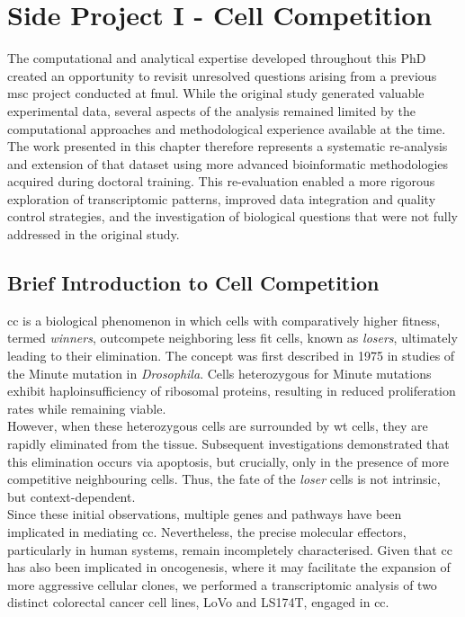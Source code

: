 \chapter{Side Project I - Cell Competition}

The computational and analytical expertise developed throughout this PhD created an opportunity to revisit unresolved questions arising from a previous \gls{msc} project conducted at \gls{fmul}. While the original study generated valuable experimental data, several aspects of the analysis remained limited by the computational approaches and methodological experience available at the time. The work presented in this chapter therefore represents a systematic re-analysis and extension of that dataset using more advanced bioinformatic methodologies acquired during doctoral training. This re-evaluation enabled a more rigorous exploration of transcriptomic patterns, improved data integration and quality control strategies, and the investigation of biological questions that were not fully addressed in the original study.

\section{Brief Introduction to Cell Competition}

\Gls{cc} is a biological phenomenon in which cells with comparatively higher fitness, termed \textit{winners}, outcompete neighboring less fit cells, known as \textit{losers}, ultimately leading to their elimination\cite{morata_cell_2021}. The concept was first described in 1975 in studies of the Minute mutation in \textit{Drosophila}\cite{morata_minutes_1975}. Cells heterozygous for Minute mutations exhibit haploinsufficiency of ribosomal proteins, resulting in reduced proliferation rates while remaining viable\cite{morata_minutes_1975}.
\\
However, when these heterozygous cells are surrounded by \gls{wt} cells, they are rapidly eliminated from the tissue\cite{morata_minutes_1975}. Subsequent investigations demonstrated that this elimination occurs via apoptosis, but crucially, only in the presence of more competitive neighbouring cells\cite{morata_cell_2021, morata_minutes_1975}. Thus, the fate of the \textit{loser} cells is not intrinsic, but context-dependent\cite{morata_cell_2021, morata_minutes_1975}.
\\
Since these initial observations, multiple genes and pathways have been implicated in mediating \gls{cc}\cite{morata_cell_2021}. Nevertheless, the precise molecular effectors, particularly in human systems, remain incompletely characterised\cite{morata_cell_2021}. Given that \gls{cc} has also been implicated in oncogenesis, where it may facilitate the expansion of more aggressive cellular clones\cite{morata_cell_2021}, we performed a transcriptomic analysis of two distinct colorectal cancer cell lines, LoVo and LS174T, engaged in \gls{cc}.

